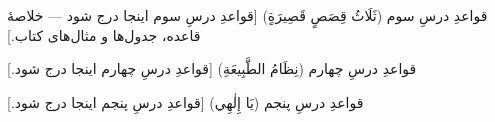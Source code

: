 
\begin{JQaede}[JCompact]{قواعدِ درسِ سوم (ثَلَاثُ قِصَصٍ قَصِيرَةٍ)}
[قواعدِ درسِ سوم اینجا درج شود — خلاصهٔ قاعده، جدول‌ها و مثال‌های کتاب.]
\end{JQaede}
\begin{JQaede}[JCompact]{قواعدِ درسِ چهارم (نِظَامُ الطَّبِيعَةِ)}
[قواعدِ درسِ چهارم اینجا درج شود.]
\end{JQaede}
\begin{JQaede}[JCompact]{قواعدِ درسِ پنجم (يَا إِلٰهِي)}
[قواعدِ درسِ پنجم اینجا درج شود.]
\end{JQaede}
